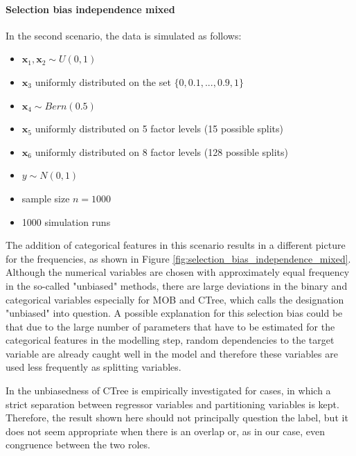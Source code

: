 \paragraph{Selection bias independence mixed \newline} 
In the second scenario, the data is simulated as follows:
\begin{itemize}
    \item $\textbf{x}_{1}, \textbf{x}_{2} \sim U(0,1)$ 
    \item $\textbf{x}_3$ uniformly distributed on the set $\{0, 0.1,..., 0.9, 1\}$ 
    \item $\textbf{x}_4  \sim Bern(0.5)$ 
    \item $\textbf{x}_5$ uniformly distributed on 5 factor levels (15 possible splits) 
    \item $\textbf{x}_6$ uniformly distributed on 8 factor levels (128 possible splits) %
    \item $y \sim N(0,1)$
    \item sample size $n = 1000$
    \item 1000 simulation runs
\end{itemize}

The addition of categorical features in this scenario results in a different picture for the frequencies, as shown in Figure \ref{fig:selection_bias_independence_mixed}. Although the numerical variables are chosen with approximately equal frequency in the so-called "unbiased" methods, there are large deviations in the binary and categorical variables especially for MOB and CTree, which calls the designation "unbiased" into question. 
A possible explanation for this selection bias could be that due to the large number of parameters that have to be estimated for the categorical features in the modelling step, random dependencies to the target variable are already caught well in the model  and therefore these variables are used less frequently as splitting variables.


In \citep{Hothorn.2006} the unbiasedness of CTree is empirically investigated for cases, in which a strict separation between regressor variables and partitioning variables is kept. Therefore, the result shown here should not principally question the label, but it does not seem appropriate when there is an overlap or, as in our case, even congruence between the two roles.


